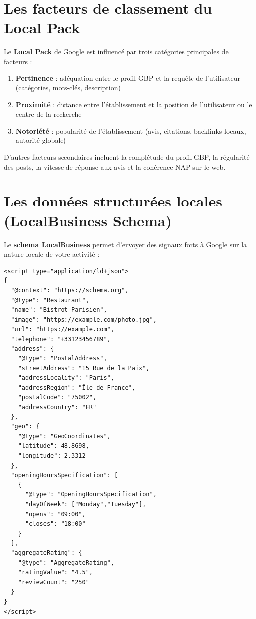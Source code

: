 \documentclass[12pt,a4paper,twoside]{report}
\newcommand{\keyword}[1]{\textbf{\textcolor{googleblue}{#1}}}
\begin{document}
\section{Les facteurs de classement du Local Pack}

Le \keyword{Local Pack} de Google est influencé par trois catégories principales de facteurs :

\begin{enumerate}
    \item \textbf{Pertinence} : adéquation entre le profil GBP et la requête de l'utilisateur (catégories, mots-clés, description)
    \item \textbf{Proximité} : distance entre l'établissement et la position de l'utilisateur ou le centre de la recherche
    \item \textbf{Notoriété} : popularité de l'établissement (avis, citations, backlinks locaux, autorité globale)
\end{enumerate}

D'autres facteurs secondaires incluent la complétude du profil GBP, la régularité des posts, la vitesse de réponse aux avis et la cohérence NAP sur le web.

\section{Les données structurées locales (LocalBusiness Schema)}

Le \keyword{schema LocalBusiness} permet d'envoyer des signaux forts à Google sur la nature locale de votre activité :

\begin{lstlisting}[style=htmlcode,caption={Exemple de LocalBusiness Schema Markup}]
<script type="application/ld+json">
{
  "@context": "https://schema.org",
  "@type": "Restaurant",
  "name": "Bistrot Parisien",
  "image": "https://example.com/photo.jpg",
  "url": "https://example.com",
  "telephone": "+33123456789",
  "address": {
    "@type": "PostalAddress",
    "streetAddress": "15 Rue de la Paix",
    "addressLocality": "Paris",
    "addressRegion": "Île-de-France",
    "postalCode": "75002",
    "addressCountry": "FR"
  },
  "geo": {
    "@type": "GeoCoordinates",
    "latitude": 48.8698,
    "longitude": 2.3312
  },
  "openingHoursSpecification": [
    {
      "@type": "OpeningHoursSpecification",
      "dayOfWeek": ["Monday","Tuesday"],
      "opens": "09:00",
      "closes": "18:00"
    }
  ],
  "aggregateRating": {
    "@type": "AggregateRating",
    "ratingValue": "4.5",
    "reviewCount": "250"
  }
}
</script>
\end{lstlisting}
\end{document}

